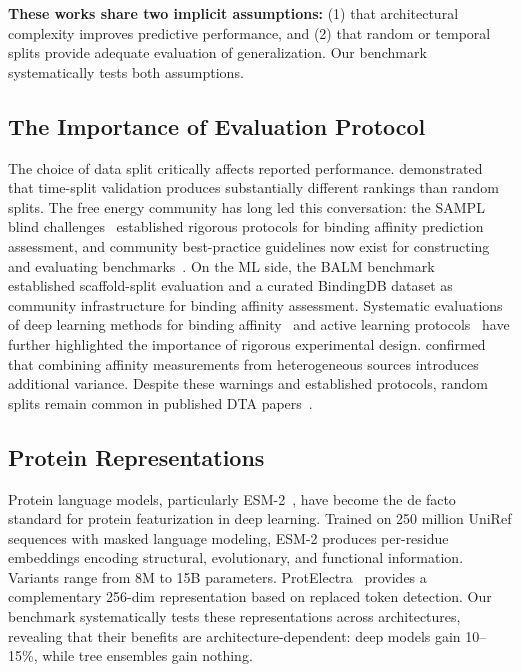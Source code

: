 \documentclass[11pt,twocolumn,a4paper]{article}
\begin{document}
\textbf{These works share two implicit assumptions:} (1) that architectural complexity improves predictive performance, and (2) that random or temporal splits provide adequate evaluation of generalization. Our benchmark systematically tests both assumptions.

\subsection{The Importance of Evaluation Protocol}

The choice of data split critically affects reported performance. \cite{sheridan2013timesplit} demonstrated that time-split validation produces substantially different rankings than random splits. The free energy community has long led this conversation: the SAMPL blind challenges~\cite{rizzi2020sampl6} established rigorous protocols for binding affinity prediction assessment, and community best-practice guidelines now exist for constructing and evaluating benchmarks~\cite{mey2024benchmark}. On the ML side, the BALM benchmark~\cite{balm2024} established scaffold-split evaluation and a curated BindingDB dataset as community infrastructure for binding affinity assessment. Systematic evaluations of deep learning methods for binding affinity~\cite{gorantla2023proteins} and active learning protocols~\cite{gorantla2024benchmarking} have further highlighted the importance of rigorous experimental design. \cite{landrum2024ic50} confirmed that combining affinity measurements from heterogeneous sources introduces additional variance. Despite these warnings and established protocols, random splits remain common in published DTA papers~\cite{cucco2026molxprot}.

\subsection{Protein Representations}

Protein language models, particularly ESM-2~\cite{lin2023esm2}, have become the de facto standard for protein featurization in deep learning. Trained on 250 million UniRef sequences with masked language modeling, ESM-2 produces per-residue embeddings encoding structural, evolutionary, and functional information. Variants range from 8M to 15B parameters. ProtElectra~\cite{elnaggar2022prottrans} provides a complementary 256-dim representation based on replaced token detection. Our benchmark systematically tests these representations across architectures, revealing that their benefits are architecture-dependent: deep models gain 10--15\%, while tree ensembles gain nothing.
\end{document}
